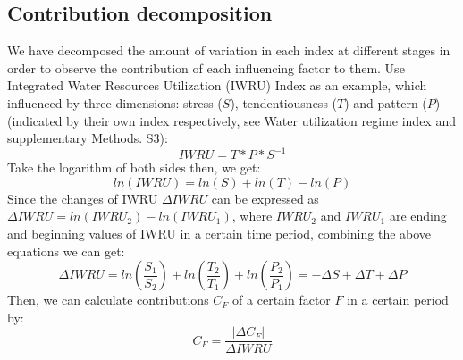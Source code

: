 \documentclass[9pt, twocolumn, twoside, lineno]{pnas-new}
\begin{document}
{	%
	\subsection*{Contribution decomposition}
		We have decomposed the amount of variation in each index at different stages in order to observe the contribution of each influencing factor to them. Use Integrated Water Resources Utilization (IWRU) Index as an example, which influenced by three dimensions: stress ($S$), tendentiousness ($T$) and pattern ($P$) (indicated by their own index respectively, see Water utilization regime index and supplementary Methods. S3):
		$$ IWRU = T * P * S ^ {-1} $$
		Take the logarithm of both sides then, we get:
		$$ ln(IWRU) = ln(S) + ln(T) - ln(P) $$
		Since the changes of IWRU $\Delta IWRU$ can be expressed as $\Delta IWRU = ln(IWRU_2) - ln(IWRU_1)$, where $IWRU_2$ and $IWRU_1$ are ending and beginning values of IWRU in a certain time period, combining the above equations we can get:
		$$ \Delta IWRU = ln(\frac{S_1}{S_2}) + ln(\frac{T_2}{T_1}) + ln(\frac{P_2}{P_1}) = -\Delta S + \Delta T + \Delta P $$
		Then, we can calculate contributions $C_F$ of a certain factor $F$ in a certain period by:
		$$ C_{F} = \frac{|\Delta C_{F}|}{\Delta IWRU}$$
}

\showmatmethods{} %


\showacknow{} %


	
\end{document}
